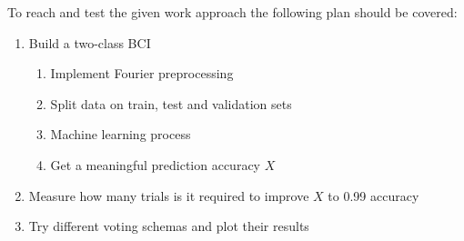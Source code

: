 \documentclass[12pt]{article}
\begin{document}
To reach and test the given work approach the following plan should be covered:
\begin{enumerate}
\item Build a two-class BCI 
\begin{enumerate}
\item Implement Fourier preprocessing
\item Split data on train, test and validation sets
\item Machine learning process
\item Get a meaningful prediction accuracy $X$
\end{enumerate}
\item Measure how many trials is it required to improve $X$ to 0.99 accuracy
\item Try different voting schemas and plot their results
\end{enumerate}
\end{document}
